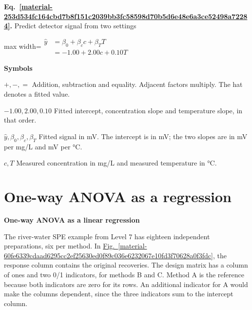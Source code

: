 \documentclass[11pt,a4paper]{article}
\begin{document}
\medskip

\par\medskip
\noindent\begin{minipage}{\linewidth}
\label{material-253d534fc164cbd7b8f151c2039bb3fc58598d70b5d6e48e6a3ce52498a72284}
\noindent\textbf{Eq.~\ref*{material-253d534fc164cbd7b8f151c2039bb3fc58598d70b5d6e48e6a3ce52498a72284}.} Predict detector signal from two settings\par\nopagebreak
\begin{center}\begin{adjustbox}{max width=\linewidth}$\displaystyle \begin{aligned}\widehat y&=\beta_0+\beta_c c+\beta_T T\\&=-1.00+2.00c+0.10T\end{aligned}$\end{adjustbox}\end{center}

\par\noindent\textbf{Symbols}

\par\noindent\textbf{\(+,-,=\)} Addition, subtraction and equality. Adjacent factors multiply. The hat denotes a fitted value.

\par\noindent\textbf{\(-1.00,2.00,0.10\)} Fitted intercept, concentration slope and temperature slope, in that order.

\par\noindent\textbf{\(\widehat y,\beta_0,\beta_c,\beta_T\)} Fitted signal in mV. The intercept is in mV; the two slopes are in mV per mg/L and mV per °C.

\par\noindent\textbf{\(c,T\)} Measured concentration in mg/L and measured temperature in °C.

\end{minipage}\par
\medskip

\clearpage
\section{One-way ANOVA as a regression}
\textbf{One-way ANOVA as a linear regression}


The river-water SPE example from Level 7 has eighteen independent preparations, six per method. In \hyperref[material-60fe6339cdaad6295cc2ef25630ed0f89c036e6232067e10fd3f70628a0f3fdc]{Fig.~\ref*{material-60fe6339cdaad6295cc2ef25630ed0f89c036e6232067e10fd3f70628a0f3fdc}}, the response column contains the original recoveries. The design matrix has a column of ones and two 0/1 indicators, for methods B and C. Method A is the reference because both indicators are zero for its rows. An additional indicator for A would make the columns dependent, since the three indicators sum to the intercept column.
\end{document}
